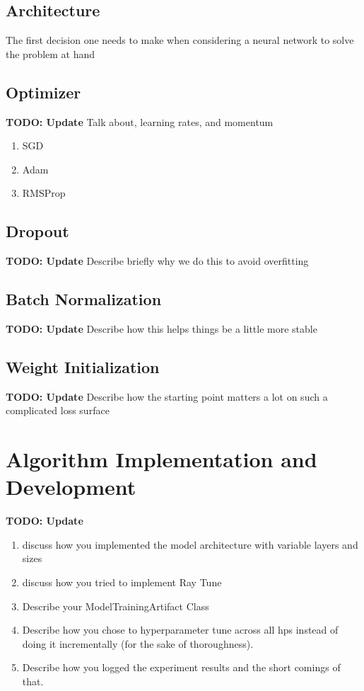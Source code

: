 \documentclass[11pt]{amsart}
\begin{document}
\subsection{Architecture}
The first decision one needs to make when considering a neural network to solve the problem at hand

\subsection{Optimizer}
\textbf{TODO: Update}
Talk about, learning rates, and momentum
\begin{enumerate}
\item SGD
\item Adam
\item RMSProp
\end{enumerate}

\subsection{Dropout}
\textbf{TODO: Update}
Describe briefly why we do this to avoid overfitting

\subsection{Batch Normalization}
\textbf{TODO: Update}
Describe how this helps things be a little more stable

\subsection{Weight Initialization}
\textbf{TODO: Update}
Describe how the starting point matters a lot on such a complicated loss surface

\section{Algorithm Implementation and Development}\label{sec:algorithms}
\textbf{TODO: Update}
\begin{enumerate}
\item discuss how you implemented the model architecture with variable layers and sizes
\item discuss how you tried to implement Ray Tune
\item Describe your ModelTrainingArtifact Class
\item Describe how you chose to hyperparameter tune across all hps instead of doing it incrementally (for the sake of thoroughness).
\item Describe how you logged the experiment results and the short comings of that.
\end{enumerate}
\end{document}
